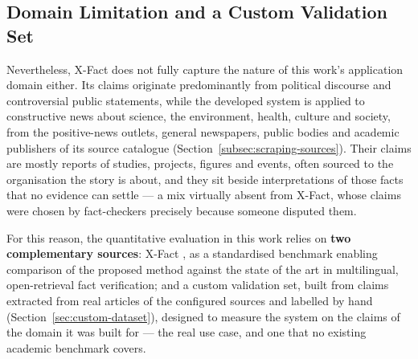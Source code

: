 
\subsection{Domain Limitation and a Custom Validation Set}
\label{subsec:custom-gold-set}

Nevertheless, X-Fact does not fully capture the nature of this
work's application domain either. Its claims originate predominantly
from political discourse and controversial public statements, while
the developed system is applied to constructive news about science,
the environment, health, culture and society, from the positive-news
outlets, general newspapers, public bodies and academic publishers of
its source catalogue (Section~\ref{subsec:scraping-sources}). Their
claims are mostly reports of studies, projects, figures and events,
often sourced to the organisation the story is about, and they sit
beside interpretations of those facts that no evidence can settle ---
a mix virtually absent from X-Fact, whose claims were chosen by
fact-checkers precisely because someone disputed them.

For this reason, the quantitative evaluation in this work relies on
\textbf{two complementary sources}: X-Fact \cite{gupta2021xfact}, as
a standardised benchmark enabling comparison of the proposed method
against the state of the art in multilingual, open-retrieval fact
verification; and a custom validation set, built from claims
extracted from real articles of the configured sources and labelled
by hand (Section~\ref{sec:custom-dataset}), designed to measure the
system on the claims of the domain it was built for --- the real use
case, and one that no existing academic benchmark covers.
